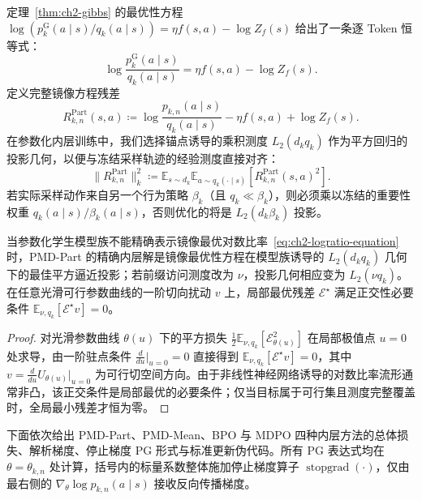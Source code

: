 \documentclass[lang=cn,scheme=chinese,openany]{elegantbook}
\newcommand{\sg}{\operatorname{stopgrad}}
\begin{document}
定理~\ref{thm:ch2-gibbs} 的最优性方程 $\log(p_k^{\mathrm G}(a\mid s)/q_k(a\mid s))=\eta f(s,a)-\log Z_f(s)$ 给出了一条逐 Token 恒等式：
\begin{equation}
\label{eq:ch2-logratio-equation}
\log\frac{ p_k^{\mathrm G}(a\mid s)}{ q_k(a\mid s)}
=\eta f(s,a)-\log Z_f(s).
\end{equation}
定义完整镜像方程残差
\begin{equation}
R_{k,n}^{\mathrm{Part}}(s,a)
\coloneqq
\log\frac{ p_{k,n}(a\mid s)}{ q_k(a\mid s)}
-\eta f(s,a)+\log Z_f(s).
\label{eq:ch2-mirror-equation-residual}
\end{equation}
在参数化内层训练中，我们选择锚点诱导的乘积测度 $L_2(d_k q_k)$ 作为平方回归的投影几何，以便与冻结采样轨迹的经验测度直接对齐：
\begin{equation}
\lVert R_{k,n}^{\mathrm{Part}}\rVert_k^2
\coloneqq
\mathbb E_{s\sim d_k}\mathbb E_{a\sim q_k(\cdot\mid s)}
\left[R_{k,n}^{\mathrm{Part}}(s,a)^2\right].
\label{eq:ch2-anchor-projection-norm}
\end{equation}
若实际采样动作来自另一个行为策略 $\beta_k$（且 $q_k\ll\beta_k$），则必须乘以冻结的重要性权重 $q_k(a\mid s)/\beta_k(a\mid s)$，否则优化的将是 $L_2(d_k\beta_k)$ 投影。

\begin{proposition}[平方回归的函数类投影含义]
\label{prop:ch2-regression-projection}
当参数化学生模型族不能精确表示镜像最优对数比率~\eqref{eq:ch2-logratio-equation} 时，PMD-Part 的精确内层解是镜像最优性方程在模型族诱导的 $L_2(d_k q_k)$ 几何下的最佳平方逼近投影；若前缀访问测度改为 $\nu$，投影几何相应变为 $L_2(\nu q_k)$。在任意光滑可行参数曲线的一阶切向扰动 $v$ 上，局部最优残差 $\mathscr E^\star$ 满足正交性必要条件 $\mathbb E_{\nu, q_k}[\mathscr E^\star v]=0$。
\end{proposition}
\begin{proof}
对光滑参数曲线 $\theta(u)$ 下的平方损失 $\frac12\mathbb E_{\nu,q_k}[\mathscr E_{\theta(u)}^2]$ 在局部极值点 $u=0$ 处求导，由一阶驻点条件 $\frac{d}{du}\big|_{u=0}=0$ 直接得到 $\mathbb E_{\nu,q_k}[\mathscr E^\star v]=0$，其中 $v=\frac{d}{du}U_{\theta(u)}\big|_{u=0}$ 为可行切空间方向。由于非线性神经网络诱导的对数比率流形通常非凸，该正交条件是局部最优的必要条件；仅当目标属于可行集且测度完整覆盖时，全局最小残差才恒为零。
\end{proof}

下面依次给出 PMD-Part、PMD-Mean、BPO 与 MDPO 四种内层方法的总体损失、解析梯度、停止梯度 PG 形式与标准更新伪代码。所有 PG 表达式均在 $\theta=\theta_{k,n}$ 处计算，括号内的标量系数整体施加停止梯度算子 $\sg(\cdot)$，仅由最右侧的 $\nabla_\theta\log p_{k,n}(a\mid s)$ 接收反向传播梯度。
\end{document}
